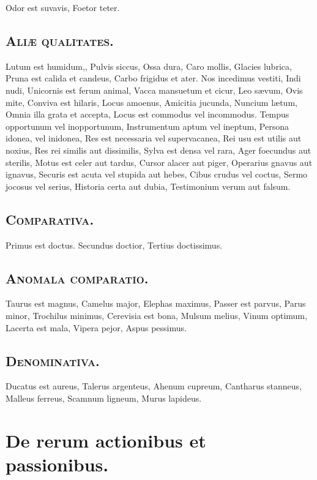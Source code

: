 \documentclass[12pt, twocolumn]{memoir}
\begin{document}
Odor est suvavis,
Foetor teter.

\section*{\textsc{Aliæ qualitates.}}

Lutum est humidum,,
Pulvis siccus,
Ossa dura,
Caro mollis,
Glacies lubrica,
Pruna est calida et candeus,
Carbo frigidus et ater.
Nos incedimus vestiti,
Indi nudi,
Unicornis est ferum animal,
Vacca mansuetum et cicur,
Leo sævum,
Ovis mite,
Conviva est hilaris,
Locus amoenus,
Amicitia jucunda,
Nuncium lætum,
Omnia illa grata et accepta,
Locus est commodus vel incommodus.
Tempus opportunum vel inopportunum,
Instrumentum aptum vel ineptum,
Persona idonea, vel inidonea,
Res est necessaria vel supervacanea,
Rei usu est utilis aut noxius,
Res rei similis aut dissimilis,
Sylva est densa vel rara,
Ager foecundus aut sterilis,
Motus est celer aut tardus,
Cursor alacer aut piger,
Operarius gnavus aut ignavus,
Securis est acuta vel stupida aut hebes,
Cibus crudus vel coctus,
Sermo jocosus vel serius,
Historia certa aut dubia,
Testimonium verum aut falsum.

\section*{\textsc{Comparativa.}}

Primus est doctus.
Secundus doctior,
Tertius doctissimus.

\section*{\textsc{Anomala comparatio.}}

Taurus est magnus,
Camelus major,
Elephas maximus,
Passer est parvus,
Parus minor,
Trochilus minimus,
Cerevisia est bona,
Mulsum melius,
Vinum optimum,
Lacerta est mala,
Vipera pejor,
Aspus pessimus.

\section*{\textsc{Denominativa.}}

Ducatus est aureus,
Talerus argenteus,
Ahenum cupreum,
Cantharus stanneus,
Malleus ferreus,
Scamnum ligneum,
Murus lapideus.

\chapter{De rerum actionibus et passionibus.}
\end{document}
